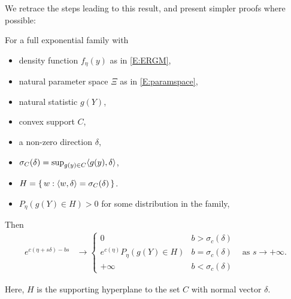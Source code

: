 We retrace the steps leading to this result, and present simpler proofs where possible:
\begin{theorem}\label{Thm:e_c}
For a full exponential family with
\begin{itemize}
\item density function $f_\eta(y)$ as in \eqref{E:ERGM},
\item natural parameter space $\Xi$ as in \eqref{E:paramspace},
\item natural statistic $g(Y)$,
\item convex support $C$,
\item  a non-zero direction $\delta$,
\item $\sigma_C (\delta) = \sup_{g(y) \in C} \langle  g(y), \delta \rangle$,
\item $H = \{\, w: \langle w, \delta \rangle = \sigma_C(\delta)  \,\}$.
\item $P_\eta(g(Y) \in H ) > 0$ for some distribution in the family,
\end{itemize}
Then
\begin{align*}
e^{c(\eta + s \delta) - bs} &\to 
		\begin{cases} 
			0 									& b > \sigma_c(\delta) \\
			e^{c(\eta)} P_\eta(g(Y) \in H ) 		& b = \sigma_c(\delta) \\
			+\infty								& b < \sigma_c(\delta)
		\end{cases}
& \text{as } s \to +\infty.
\end{align*}

\end{theorem}
Here, $H$ is the supporting hyperplane to the set $C$ with normal vector $\delta$.

